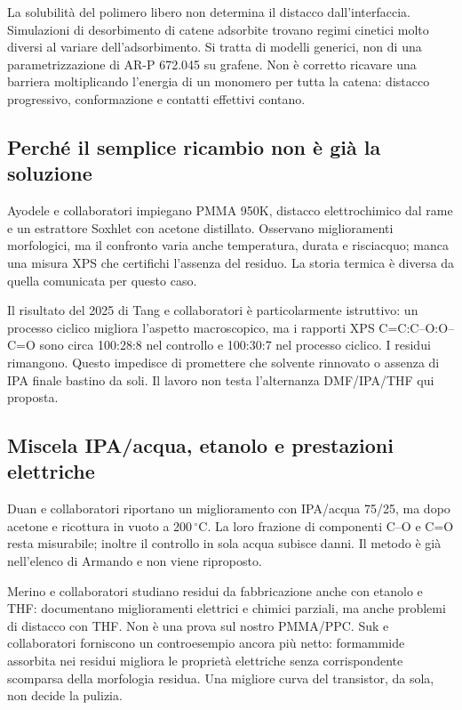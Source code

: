 \documentclass[11pt,reqno]{amsart}
\numberwithin{equation}{section}
\newcommand{\degC}{\ensuremath{^{\circ}\mathrm{C}}}
\begin{document}
La solubilit\`a del polimero libero non determina il distacco
dall'interfaccia. Simulazioni di desorbimento di catene adsorbite
\cite{Huston2020} trovano regimi cinetici molto diversi al variare
dell'adsorbimento. Si tratta di modelli generici, non di una
parametrizzazione di AR-P 672.045 su grafene. Non \`e corretto
ricavare una barriera moltiplicando l'energia di un monomero per
tutta la catena: distacco progressivo, conformazione e contatti
effettivi contano.

\subsection{Perch\'e il semplice ricambio non \`e gi\`a la soluzione}
Ayodele e collaboratori \cite{Ayodele2022} impiegano PMMA 950K,
distacco elettrochimico dal rame e un estrattore Soxhlet con acetone
distillato. Osservano miglioramenti morfologici, ma il confronto
varia anche temperatura, durata e risciacquo; manca una misura XPS
che certifichi l'assenza del residuo. La storia termica \`e diversa
da quella comunicata per questo caso.

Il risultato del 2025 di Tang e collaboratori \cite{Tang2025}
\`e particolarmente istruttivo: un processo ciclico migliora
l'aspetto macroscopico, ma i rapporti XPS
C=C:C--O:O--C=O sono circa 100:28:8 nel controllo e 100:30:7
nel processo ciclico. I residui rimangono. Questo impedisce di
promettere che solvente rinnovato o assenza di IPA finale bastino
da soli. Il lavoro non testa l'alternanza DMF/IPA/THF qui proposta.

\subsection{Miscela IPA/acqua, etanolo e prestazioni elettriche}
Duan e collaboratori \cite{Duan2022} riportano un miglioramento
con IPA/acqua 75/25, ma dopo acetone e ricottura in vuoto a
200\,\degC. La loro frazione di componenti C--O e C=O resta
misurabile; inoltre il controllo in sola acqua subisce danni.
Il metodo \`e gi\`a nell'elenco di Armando e non viene riproposto.

Merino e collaboratori \cite{Merino2024} studiano residui da
fabbricazione anche con etanolo e THF: documentano miglioramenti
elettrici e chimici parziali, ma anche problemi di distacco con
THF. Non \`e una prova sul nostro PMMA/PPC. Suk e collaboratori
\cite{Suk2013} forniscono un controesempio ancora pi\`u netto:
formammide assorbita nei residui migliora le propriet\`a elettriche
senza corrispondente scomparsa della morfologia residua.
Una migliore curva del transistor, da sola, non decide la pulizia.
\end{document}
